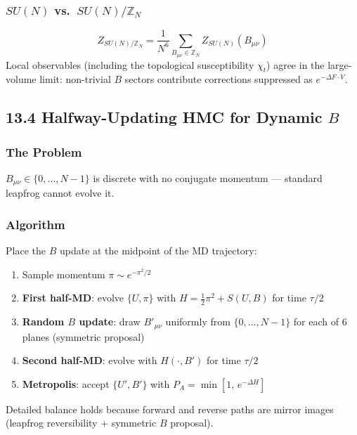 \documentclass[12pt,a4paper]{article}
\begin{document}
\subsubsection*{$SU(N)$ vs.\ $SU(N)/\mathbb{Z}_N$}

\begin{equation}
  Z_{SU(N)/\mathbb{Z}_N} = \frac{1}{N^6}\sum_{B_{\mu\nu}\in\mathbb{Z}_N} Z_{SU(N)}(B_{\mu\nu})
\end{equation}
Local observables (including the topological susceptibility $\chi_t$) agree in the large-volume limit:
non-trivial $B$ sectors contribute corrections suppressed as $e^{-\Delta F\cdot V}$.

\subsection*{13.4 Halfway-Updating HMC for Dynamic $B$}

\subsubsection*{The Problem}

$B_{\mu\nu}\in\{0,\ldots,N{-}1\}$ is discrete with no conjugate momentum ---
standard leapfrog cannot evolve it.

\subsubsection*{Algorithm}

Place the $B$ update at the midpoint of the MD trajectory:

\begin{enumerate}
  \item Sample momentum $\pi\sim e^{-\pi^2/2}$
  \item \textbf{First half-MD}: evolve $\{U,\pi\}$ with
        $H=\tfrac{1}{2}\pi^2+S(U,B)$ for time $\tau/2$
  \item \textbf{Random $B$ update}: draw $B'_{\mu\nu}$ uniformly from $\{0,\ldots,N{-}1\}$
        for each of 6 planes (symmetric proposal)
  \item \textbf{Second half-MD}: evolve with $H(\cdot,B')$ for time $\tau/2$
  \item \textbf{Metropolis}: accept $\{U',B'\}$ with
        $P_A=\min[1,\,e^{-\Delta H}]$
\end{enumerate}

Detailed balance holds because forward and reverse paths are mirror images
(leapfrog reversibility + symmetric $B$ proposal).
\end{document}
